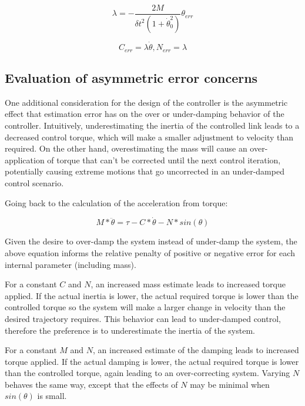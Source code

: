 \begin{equation}
\lambda 
=
- \dfrac{2M}{\delta t^{2} (1 + \dot{\theta}_{0}^{2})} \theta_{err}
\end{equation}

\begin{equation}
C_{err} = \lambda \dot{\theta}, N_{err} = \lambda
\end{equation}

\subsection{Evaluation of asymmetric error concerns}

One additional consideration for the design of the controller is the asymmetric
effect that estimation error has on the over or under-damping behavior of the
controller. Intuitively,
underestimating the inertia of the controlled link leads to a decreased control
torque, which will make a smaller adjustment to velocity than required. On the
other hand, overestimating the mass will cause an over-application of torque
that can't be corrected until the next control iteration, potentially causing
extreme motions that go uncorrected in an under-damped control scenario.

Going back to the calculation of the acceleration from torque:

\begin{equation}
M * \ddot{\theta} = \tau - C * \dot{\theta} - N * sin(\theta)
\end{equation}

Given the desire to over-damp the system instead of under-damp the system, the
above equation informs the relative penalty of positive or negative error for
each internal parameter (including mass).

For a constant $C$ and $N$, an increased mass estimate leads to increased torque
applied. If the actual inertia is lower, the actual required torque is lower 
than the controlled torque so the system will make a larger change in velocity 
than the desired trajectory requires. This behavior can lead to under-damped 
control, therefore the preference is to underestimate the inertia of the system.

For a constant $M$ and $N$, an increased estimate of the damping leads to 
increased torque applied. If the actual damping is lower, the actual required
torque is lower than the controlled torque, again leading to an over-correcting
system. Varying $N$ behaves the same way, except that the effects of $N$ may be
minimal when $sin(\theta)$ is small.
